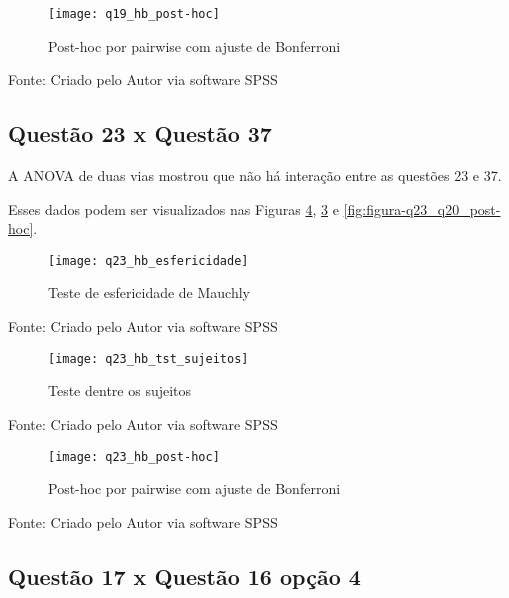\begin{figure}[H]
	\centering	
	\caption{Post-hoc por pairwise com ajuste de Bonferroni}
	\texttt{[image: q19\_hb\_post-hoc]}
	\label{fig:figura-q19_hb_post-hoc}
\end{figure}
\vspace{-0.8 cm} \hspace{1.55 cm} Fonte: Criado pelo Autor via software SPSS

\subsection{Questão 23 x Questão 37}

A ANOVA de duas vias mostrou que não há interação entre as questões 23 e 37.

Esses dados podem ser visualizados nas Figuras \ref{fig:figura-q23_hb_post-hoc}, \ref{fig:figura-q23_hb_tst_sujeitos} e \ref{fig:figura-q23_q20_post-hoc}.
\begin{figure}[H]
	\centering	
	\caption{Teste de esfericidade de Mauchly}
	\texttt{[image: q23\_hb\_esfericidade]}
	\label{fig:figura-q23_hb_esfericidade}
\end{figure}
\vspace{-0.8 cm} \hspace{1.55 cm} Fonte: Criado pelo Autor via software SPSS

\begin{figure}[H]
	\centering	
	\caption{Teste dentre os sujeitos}
	\texttt{[image: q23\_hb\_tst\_sujeitos]}
	\label{fig:figura-q23_hb_tst_sujeitos}
\end{figure}
\vspace{-0.8 cm} \hspace{1.55 cm} Fonte: Criado pelo Autor via software SPSS

\begin{figure}[H]
	\centering	
	\caption{Post-hoc por pairwise com ajuste de Bonferroni}
	\texttt{[image: q23\_hb\_post-hoc]}
	\label{fig:figura-q23_hb_post-hoc}
\end{figure}
\vspace{-0.8 cm} \hspace{1.55 cm} Fonte: Criado pelo Autor via software SPSS

\subsection{Questão 17 x Questão 16 opção 4}

